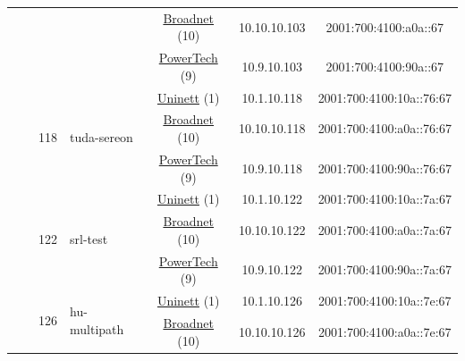 \begin{small}
\begin{center}
\begin{longtable}{|c|c|c|c|c|c|c|c|}
  &  & \multicolumn{2}{|c|}{} & \multicolumn{2}{|c|}{\tiny{\href{https://www.broadnet.no}{Broadnet} (10)}} & \tiny{10.10.10.103} & \tiny{2001:700:4100:a0a::67} \\* \cline{5-5}\cline{6-6}\cline{7-7}\cline{8-8}
  &  & \multicolumn{2}{|c|}{} & \multicolumn{2}{|c|}{\tiny{\href{http://www.powertech.no}{PowerTech} (9)}} & \tiny{10.9.10.103} & \tiny{2001:700:4100:90a::67} \\* \cline{3-3}\cline{4-4}\cline{5-5}\cline{6-6}\cline{7-7}\cline{8-8}
  &  & \multirow{3}{*}{\tiny{118}} & \multicolumn{1}{|l|}{\multirow{3}{*}{\tiny{tuda-sereon}}} & \multicolumn{2}{|c|}{\tiny{\href{https://www.uninett.no}{Uninett} (1)}} & \tiny{10.1.10.118} & \tiny{2001:700:4100:10a::76:67} \\* \cline{5-5}\cline{6-6}\cline{7-7}\cline{8-8}
  &  &  &  & \multicolumn{2}{|c|}{\tiny{\href{https://www.broadnet.no}{Broadnet} (10)}} & \tiny{10.10.10.118} & \tiny{2001:700:4100:a0a::76:67} \\* \cline{5-5}\cline{6-6}\cline{7-7}\cline{8-8}
  &  &  &  & \multicolumn{2}{|c|}{\tiny{\href{http://www.powertech.no}{PowerTech} (9)}} & \tiny{10.9.10.118} & \tiny{2001:700:4100:90a::76:67} \\* \cline{3-3}\cline{4-4}\cline{5-5}\cline{6-6}\cline{7-7}\cline{8-8}
  &  & \multirow{3}{*}{\tiny{122}} & \multicolumn{1}{|l|}{\multirow{3}{*}{\tiny{srl-test}}} & \multicolumn{2}{|c|}{\tiny{\href{https://www.uninett.no}{Uninett} (1)}} & \tiny{10.1.10.122} & \tiny{2001:700:4100:10a::7a:67} \\* \cline{5-5}\cline{6-6}\cline{7-7}\cline{8-8}
  &  &  &  & \multicolumn{2}{|c|}{\tiny{\href{https://www.broadnet.no}{Broadnet} (10)}} & \tiny{10.10.10.122} & \tiny{2001:700:4100:a0a::7a:67} \\* \cline{5-5}\cline{6-6}\cline{7-7}\cline{8-8}
  &  &  &  & \multicolumn{2}{|c|}{\tiny{\href{http://www.powertech.no}{PowerTech} (9)}} & \tiny{10.9.10.122} & \tiny{2001:700:4100:90a::7a:67} \\* \cline{3-3}\cline{4-4}\cline{5-5}\cline{6-6}\cline{7-7}\cline{8-8}
  &  & \multirow{3}{*}{\tiny{126}} & \multicolumn{1}{|l|}{\multirow{3}{*}{\tiny{hu-multipath}}} & \multicolumn{2}{|c|}{\tiny{\href{https://www.uninett.no}{Uninett} (1)}} & \tiny{10.1.10.126} & \tiny{2001:700:4100:10a::7e:67} \\* \cline{5-5}\cline{6-6}\cline{7-7}\cline{8-8}
  &  &  &  & \multicolumn{2}{|c|}{\tiny{\href{https://www.broadnet.no}{Broadnet} (10)}} & \tiny{10.10.10.126} & \tiny{2001:700:4100:a0a::7e:67} \\* \cline{5-5}\cline{6-6}\cline{7-7}\cline{8-8}

\end{longtable}
\end{center}
\end{small}
